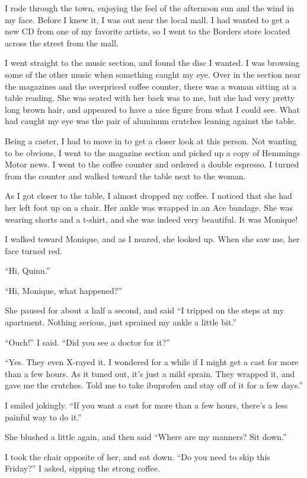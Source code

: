 I rode through the town, enjoying the feel of the afternoon sun and the wind in my face.
Before I knew it, I was out near the local mall. I had wanted to get a new CD from one of my
favorite artists, so I went to the Borders store located across the street from the mall.

I went straight to the music section, and found the disc I wanted. I was browsing some of
the other music when something caught my eye. Over in the section near the magazines and the
overpriced coffee counter, there was a woman sitting at a table reading. She was seated with her
back was to me, but she had very pretty long brown hair, and appeared to have a nice figure from
what I could see. What had caught my eye was the pair of aluminum crutches leaning against the
table.

Being a caster, I had to move in to get a closer look at this person. Not wanting to be
obvious, I went to the magazine section and picked up a copy of Hemmings Motor news. I went to
the coffee counter and ordered a double espresso. I turned from the counter and walked toward
the table next to the woman.

As I got closer to the table, I almost dropped my coffee. I noticed that she had her left
foot up on a chair. Her ankle was wrapped in an Ace bandage. She was wearing shorts and a
t-shirt, and she was indeed very beautiful. It was Monique!

I walked toward Monique, and as I neared, she looked up. When she saw me, her face turned
red.

``Hi, Quinn.''

``Hi, Monique, what happened?''

She paused for about a half a second, and said ``I tripped on the steps at my apartment.
Nothing serious, just sprained my ankle a little bit.''

``Ouch!'' I said. ``Did you see a doctor for it?''

``Yes. They even X-rayed it. I wondered for a while if I might get a cast for more than a
few hours. As it tuned out, it's just a mild sprain. They wrapped it, and gave me the crutches.
Told me to take ibuprofen and stay off of it for a few days.''

I smiled jokingly. ``If you want a cast for more than a few hours, there's a less painful
way to do it.''

She blushed a little again, and then said ``Where are my manners? Sit down.''

I took the chair opposite of her, and sat down. ``Do you need to skip this Friday?'' I
asked, sipping the strong coffee.

